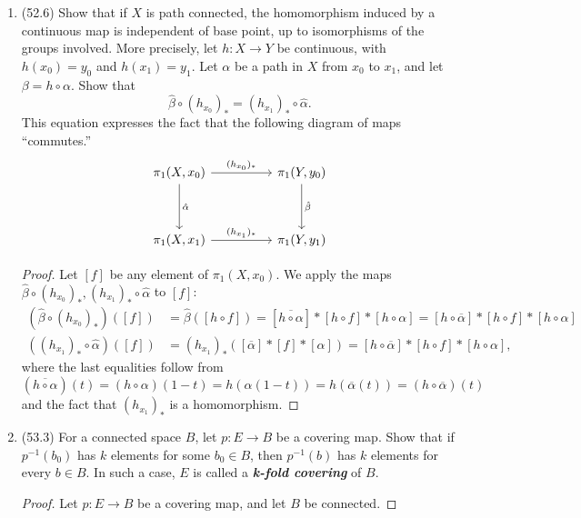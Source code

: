 \documentclass[11pt]{article}
\DeclareMathOperator{\id}{id}
\begin{document}
\begin{enumerate}
\begin{proof}
        Alternatively, we use the functorial properties of the induced homomorphism to see that since $r\circ i_{A\xhookrightarrow{} X} = \id_A$, we have that $\id_{\pi_1(A,a_0)} = (\id_A)_\ast = (r\circ i_{A\xhookrightarrow{} X})_\ast = r_\ast \circ (i_{A\xhookrightarrow{} X})_\ast$. Thus $r_\ast$ has a right inverse and so must be surjective.
    \end{proof}
    \item (52.6) Show that if $X$ is path connected, the homomorphism induced by a continuous map is independent of base point, up to isomorphisms of the groups involved. More precisely, let $h\colon X\to Y$ be continuous, with $h(x_0) = y_0$ and $h(x_1) = y_1$. Let $\alpha$ be a path in $X$ from $x_0$ to $x_1$, and let $\beta = h\circ \alpha$. Show that \[\hat{\beta}\circ (h_{x_0})_\ast = (h_{x_1})_\ast\circ\hat{\alpha}.\] This equation expresses the fact that the following diagram of maps ``commutes.''\[\begin{tikzcd}
        {\pi_1(X,x_0)} && {\pi_1(Y,y_0)} \\
        \\
        {\pi_1(X,x_1)} && {\pi_1(Y,y_1)}
        \arrow["{(h_{x_0})_\ast}", from=1-1, to=1-3]
        \arrow["{(h_{x_1})_\ast}", from=3-1, to=3-3]
        \arrow["{\hat{\alpha}}", from=1-1, to=3-1]
        \arrow["{\hat{\beta}}", from=1-3, to=3-3]
    \end{tikzcd}\]
    \begin{proof}
        Let $[f]$ be any element of $\pi_1(X,x_0)$. We apply the maps $\hat{\beta}\circ (h_{x_0})_\ast , (h_{x_1})_\ast\circ\hat{\alpha}$ to $[f]$:
        \begin{align*}
            (\hat{\beta}\circ (h_{x_0})_\ast)([f]) &= \hat{\beta}([h\circ f]) = [\overline{h\circ \alpha}]\ast [h\circ f]\ast [h\circ \alpha] = [h\circ \overline{\alpha}]\ast [h\circ f]\ast [h\circ \alpha]\\
            ((h_{x_1})_\ast\circ\hat{\alpha})([f]) &= (h_{x_1})_\ast([\overline{\alpha}]\ast[f]\ast[\alpha]) = [h\circ \overline{\alpha}]\ast [h\circ f]\ast [h\circ \alpha],
        \end{align*} where the last equalities follow from $(\overline{h\circ \alpha})(t) = (h\circ \alpha)(1-t) = h(\alpha(1-t)) = h(\overline{\alpha}(t)) = (h\circ \overline{\alpha})(t)$ and the fact that $(h_{x_1})_\ast$ is a homomorphism.
    \end{proof}
    \item (53.3) For a connected space $B$, let $p\colon E\to B$ be a covering map. Show that if $p^{-1}(b_0)$ has $k$ elements for some $b_0\in B$, then $p^{-1}(b)$ has $k$ elements for every $b\in B$. In such a case, $E$ is called a \textbf{\textit{k-fold covering}} of $B$.
    \begin{proof}Let $p\colon E\to B$ be a covering map, and let $B$ be connected.


\end{proof}
\end{enumerate}
\end{document}
